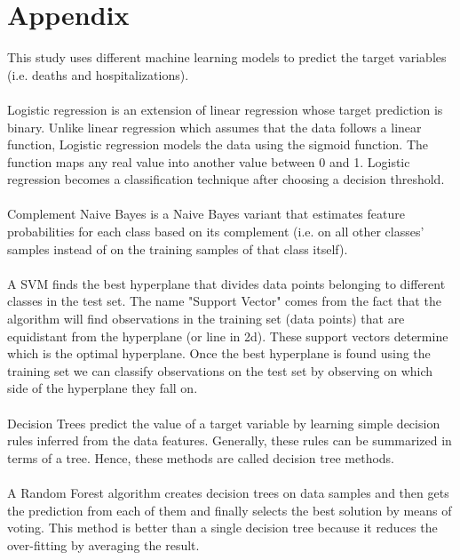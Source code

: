 \documentclass[hidelinks,10pt]{article}
\begin{document}
\section{Appendix}
This study uses different machine learning models to predict the target variables (i.e. deaths and hospitalizations). 
\\
\\
Logistic regression is an extension of linear regression whose target prediction is binary. Unlike linear regression which assumes that the data follows a linear function, Logistic regression models the data using the sigmoid function. The function maps any real value into another value between 0 and 1. Logistic regression becomes a classification technique after choosing a decision threshold. 
\\
\\
Complement Naive Bayes is a Naive Bayes variant that estimates feature probabilities for each class based on its complement (i.e. on all other classes’ samples instead of on the training samples of that class itself). 
\\
\\
A SVM finds the best hyperplane that divides data points belonging to different classes in the test set. The name "Support Vector" comes from the fact that the algorithm will find observations in the training set (data points) that are equidistant from the hyperplane (or line in 2d). These support vectors determine which is the optimal hyperplane. Once the best hyperplane is found using the training set we can classify observations on the test set by observing on which side of the hyperplane they fall on.
\\
\\
Decision Trees predict the value of a target variable by learning simple decision rules inferred from the data features. Generally, these rules can be summarized in terms of a tree. Hence, these methods are called decision tree methods. 
\\
\\
A Random Forest algorithm creates decision trees on data samples and then gets the prediction from each of them and finally selects the best solution by means of voting. This method is better than a single decision tree because it reduces the over-fitting by averaging the result.


	\newpage
\end{document}

